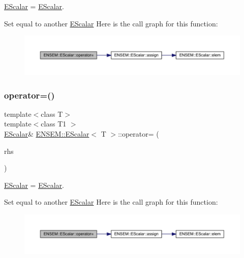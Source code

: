 \mbox{\hyperlink{classENSEM_1_1EScalar}{E\+Scalar}} = \mbox{\hyperlink{classENSEM_1_1EScalar}{E\+Scalar}}. 

Set equal to another \mbox{\hyperlink{classENSEM_1_1EScalar}{E\+Scalar}} Here is the call graph for this function\+:
\nopagebreak
\begin{figure}[H]
\begin{center}
\leavevmode
\includegraphics[width=350pt]{d0/d82/classENSEM_1_1EScalar_a8ec804b8b082a748bb364fbb4a511757_cgraph}
\end{center}
\end{figure}
\mbox{\label{classENSEM_1_1EScalar_a8ec804b8b082a748bb364fbb4a511757}} 
\subsubsection{\texorpdfstring{operator=()}{operator=()}\hspace{0.1cm}{\footnotesize\ttfamily [11/12]}}
{\footnotesize\ttfamily template$<$class T$>$ \\
template$<$class T1 $>$ \\
\mbox{\hyperlink{classENSEM_1_1EScalar}{E\+Scalar}}\& \mbox{\hyperlink{classENSEM_1_1EScalar}{E\+N\+S\+E\+M\+::\+E\+Scalar}}$<$ T $>$\+::operator= (\begin{DoxyParamCaption}\item[{const \mbox{\hyperlink{classENSEM_1_1EScalar}{E\+Scalar}}$<$ T1 $>$ \&}]{rhs }\end{DoxyParamCaption})\hspace{0.3cm}{\ttfamily [inline]}}



\mbox{\hyperlink{classENSEM_1_1EScalar}{E\+Scalar}} = \mbox{\hyperlink{classENSEM_1_1EScalar}{E\+Scalar}}. 

Set equal to another \mbox{\hyperlink{classENSEM_1_1EScalar}{E\+Scalar}} Here is the call graph for this function\+:
\nopagebreak
\begin{figure}[H]
\begin{center}
\leavevmode
\includegraphics[width=350pt]{d0/d82/classENSEM_1_1EScalar_a8ec804b8b082a748bb364fbb4a511757_cgraph}
\end{center}
\end{figure}
\mbox{\label{classENSEM_1_1EScalar_a8ec804b8b082a748bb364fbb4a511757}} 
